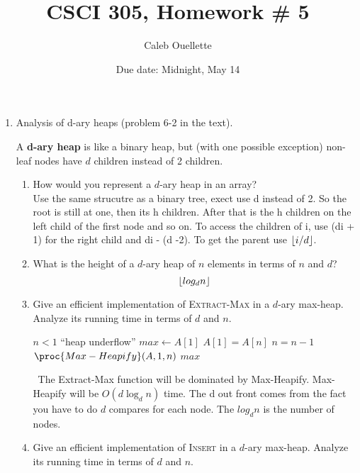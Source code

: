 \documentclass{article}
\title{CSCI 305, Homework \# 5}
\author{Caleb Ouellette}
\date{Due date:  Midnight, May 14}
\DeclarePairedDelimiter\floor{\lfloor}{\rfloor}
\begin{document}
  
  \maketitle
  
  \begin{enumerate}
  \item Analysis of d-ary heaps (problem 6-2 in the text).
  
  A \textbf{d-ary heap} is like a binary heap, but (with one possible
  exception) non-leaf nodes have $d$ children instead of 2 children.
  \begin{enumerate}
  \item How would you represent a $d$-ary heap in an array? \\
    Use the same strucutre as a binary tree, exect use d instead of 2. So the root is still at one, 
    then its h children. After that is the h children on the left child of the first node and so on. 
    To access the children of i, use (di + 1) for the right child and di - (d -2). To get the parent use $\floor*{i/d}$.
    
  \item What is the height of a $d$-ary heap of $n$ elements in terms
    of $n$ and $d$? \\
    \begin{equation*}
    \floor*{log_d n}
    \end{equation*}

  \item Give an efficient implementation of \textsc{Extract-Max} in
      a $d$-ary max-heap.  Analyze its running time in terms of $d$
    and $n$.
        \begin{codebox}
          \li \If $n < 1$ \Do
          \li \Error ``heap underflow''
        \End
        \li $max \gets A[1]$
        \li $A[1] = A[n]$
        \li $n = n-1$
        \li $\proc{Max-Heapify}(A,1,n)$
        \li \Return $max$
        \end{codebox}
        \ The Extract-Max function will be dominated by Max-Heapify. 
        Max-Heapify will be $O(d \log_d n)$ time. 
        The d out front comes from the fact you have to do $d$ compares for each node. 
        The $log_d n$ is the number of nodes.
        
      \item Give an efficient implementation of \textsc{Insert} in
        a $d$-ary max-heap.  Analyze its running time in terms of $d$
        and $n$.


\end{enumerate}
\end{enumerate}
\end{document}
